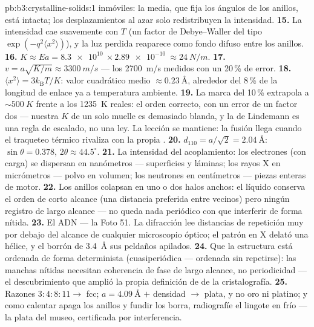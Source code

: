\begin{solution}{pb:b3:crystalline-solids:1}
{inmóviles}: la  media, que fija los ángulos de los anillos, está intacta;
los desplazamientos al azar solo redistribuyen la intensidad.
\textbf{15.} La intensidad cae suavemente con $T$ (un factor de
Debye--Waller del tipo $\exp(-q^2\langle x^2\rangle)$), y la
luz perdida reaparece como fondo difuso entre los anillos.
\textbf{16.} $K \approx Ea = \qty{8.3e10}{}\times
\qty{2.89e-10}{} \approx \qty{24}{N/m}$.
\textbf{17.} $v = a\sqrt{K/m} \approx \qty{3300}{m/s}$ ---
los \qty{2700}{m/s} medidos con un 20\,\% de error.
\textbf{18.} $\langle x^2\rangle = 3k_{\text{B}}T/K$: valor cuadrático medio
$\approx\qty{0.23}{\angstrom}$, alrededor del 8\,\% de la longitud de enlace
ya a temperatura ambiente.
\textbf{19.} La marca del 10\,\% extrapola a $\sim\qty{500}{K}$
frente a los \qty{1235}{K} reales: el orden correcto, con un error de un factor dos
--- nuestra $K$ de un solo muelle es demasiado blanda, y la de Lindemann es una regla
de escalado, no una ley. La lección se mantiene: la fusión llega cuando el traqueteo
térmico rivaliza con la propia .
\textbf{20.} $d_{110} = a/\sqrt2 = \qty{2.04}{\angstrom}$:
$\sin\theta = 0.378$, $2\theta \approx 44.5^\circ$.
\textbf{21.} La intensidad del acoplamiento: los electrones (con carga) se dispersan en
nanómetros --- superficies y láminas; los rayos X en micrómetros ---
polvo en volumen; los neutrones en centímetros --- piezas enteras de motor.
\textbf{22.} Los anillos colapsan en uno o dos halos anchos:
el líquido conserva el orden de corto alcance (una distancia preferida entre
vecinos) pero ningún registro de largo alcance --- no queda nada periódico con que
interferir de forma nítida.
\textbf{23.} El ADN --- la Foto 51. La difracción lee distancias de
repetición muy por debajo del alcance de cualquier microscopio óptico; el patrón en X
delató una hélice, y el borrón de \qty{3.4}{\angstrom} sus peldaños
apilados.
\textbf{24.} Que la estructura está ordenada de forma determinista
(cuasiperiódica --- ordenada sin repetirse): las manchas nítidas necesitan
coherencia de fase de largo alcance, no periodicidad --- el descubrimiento
que amplió la propia definición de  de la cristalografía.
\textbf{25.} Razones $3:4:8:11 \to$ fcc; $a = \qty{4.09}{\angstrom}$
$+$ densidad $\to$ plata, y no oro ni platino; y como calentar
apaga los anillos y fundir los borra, radiografíe el lingote en frío ---
la plata del museo, certificada por interferencia.
\end{solution}
